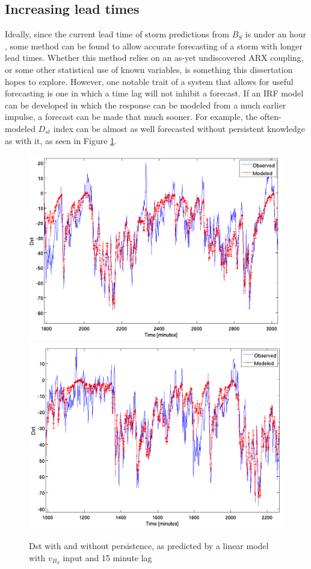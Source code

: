 \documentclass[10pt]{article}
\begin{document}
\subsection{Increasing lead times}
Ideally, since the current lead time of storm predictions from $B_S$ is under an hour \citep{StatCompStorms}, some method can be found to allow accurate forecasting of a storm with longer lead times. Whether this method relies on an as-yet undiscovered ARX coupling, or some other statistical use of known variables, is something this dissertation hopes to explore. However, one notable trait of a system that allows for useful forecasting is one in which a time lag will not inhibit a forecast. If an IRF model can be developed in which the response can be modeled from a much earlier impulse, a forecast can be made that much sooner. For example, the often-modeled $D_{st}$ index can be almost as well forecasted without persistent knowledge as with it, as seen in Figure \ref{DST}.

\begin{figure}[h!]
\centering
\includegraphics[scale=0.25]{DstExample.png}
\includegraphics[scale=0.25]{DstNoPersist.png}
\caption{Dst with and without persistence, as predicted by a linear model with $v_{B_S}$ input and 15 minute lag}
\label{DST}
\end{figure}
\end{document}
